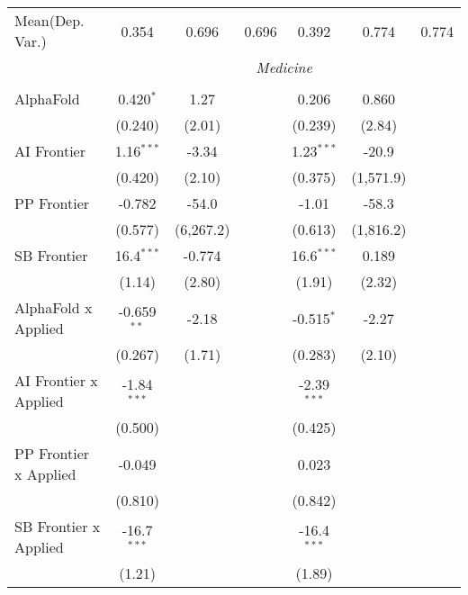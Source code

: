 \begin{tabular}{lcccccc}
Mean(Dep. Var.) & 0.354 & 0.696 & 0.696 & 0.392 & 0.774 & 0.774 \\
 & \multicolumn{6}{c}{\textit{Medicine}} \\ \\
   AlphaFold                    & 0.420$^{*}$   & 1.27      &             & 0.206         & 0.860     &   \\   
                                & (0.240)       & (2.01)    &             & (0.239)       & (2.84)    &   \\   
   AI Frontier                  & 1.16$^{***}$  & -3.34     &             & 1.23$^{***}$  & -20.9     &   \\   
                                & (0.420)       & (2.10)    &             & (0.375)       & (1,571.9) &   \\   
   PP Frontier                  & -0.782        & -54.0     &             & -1.01         & -58.3     &   \\   
                                & (0.577)       & (6,267.2) &             & (0.613)       & (1,816.2) &   \\   
   SB Frontier                  & 16.4$^{***}$  & -0.774    &             & 16.6$^{***}$  & 0.189     &   \\   
                                & (1.14)        & (2.80)    &             & (1.91)        & (2.32)    &   \\   
   AlphaFold x Applied          & -0.659$^{**}$ & -2.18     &             & -0.515$^{*}$  & -2.27     &   \\   
                                & (0.267)       & (1.71)    &             & (0.283)       & (2.10)    &   \\   
   AI Frontier x Applied        & -1.84$^{***}$ &           &             & -2.39$^{***}$ &           &   \\   
                                & (0.500)       &           &             & (0.425)       &           &   \\   
   PP Frontier x Applied        & -0.049        &           &             & 0.023         &           &   \\   
                                & (0.810)       &           &             & (0.842)       &           &   \\   
   SB Frontier x Applied        & -16.7$^{***}$ &           &             & -16.4$^{***}$ &           &   \\   
                                & (1.21)        &           &             & (1.89)        &           &   \\   

\end{tabular}
